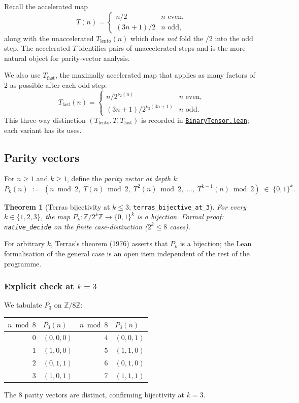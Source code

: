 \documentclass[11pt,a4paper]{article}
\theoremstyle{plain}
\newtheorem{theorem}{Theorem}[section]
\theoremstyle{definition}
\newcommand{\ZZ}{\mathbb{Z}}
\begin{document}
Recall the accelerated map
\[
  T(n) = \begin{cases} n/2 & n \text{ even}, \\
                       (3n+1)/2 & n \text{ odd}, \end{cases}
\]
along with the unaccelerated $T_{\mathrm{lento}}(n)$ which does
\emph{not} fold the $/2$ into the odd step. The accelerated $T$
identifies pairs of unaccelerated steps and is the more natural
object for parity-vector analysis.

We also use $T_{\mathrm{fast}}$, the maximally accelerated map that
applies as many factors of $2$ as possible after each odd step:
\[
   T_{\mathrm{fast}}(n) = \begin{cases}
       n/2^{\nu_2(n)} & n \text{ even}, \\
       (3n + 1)/2^{\nu_2(3n+1)} & n \text{ odd}.
   \end{cases}
\]
This three-way distinction $(T_{\mathrm{lento}}, T, T_{\mathrm{fast}})$
is recorded in
\href{run:CollatzLean4/CollatzLean4/BinaryTensor.lean}%
{\texttt{BinaryTensor.lean}}; each variant has its uses.

\subsection{Parity vectors}

For $n \ge 1$ and $k \ge 1$, define the \emph{parity vector at
depth $k$}:
\[
  P_k(n) \;:=\; (n \bmod 2,\; T(n) \bmod 2,\; T^2(n) \bmod 2,\;
                 \dots,\; T^{k-1}(n) \bmod 2)
   \;\in\; \{0, 1\}^k.
\]

\begin{theorem}[Terras bijectivity at $k \le 3$;
\texttt{terras\_bijective\_at\_3}]
\label{thm:terras-bijection}
For every $k \in \{1, 2, 3\}$, the map
\(
   P_k : \ZZ/2^k\ZZ \to \{0, 1\}^k
\)
is a bijection. Formal proof: \texttt{native\_decide} on the
finite case-distinction ($2^k \le 8$ cases).
\end{theorem}

For arbitrary $k$, Terras's theorem (1976) asserts that
$P_k$ is a bijection; the Lean formalisation of the general case is
an open item independent of the rest of the programme.

\subsubsection*{Explicit check at $k = 3$}

We tabulate $P_3$ on $\ZZ/8\ZZ$:
\begin{center}\footnotesize
\begin{tabular}{rl|rl}
\toprule
$n \bmod 8$ & $P_3(n)$ & $n \bmod 8$ & $P_3(n)$ \\
\midrule
$0$ & $(0, 0, 0)$ & $4$ & $(0, 0, 1)$ \\
$1$ & $(1, 0, 0)$ & $5$ & $(1, 1, 0)$ \\
$2$ & $(0, 1, 1)$ & $6$ & $(0, 1, 0)$ \\
$3$ & $(1, 0, 1)$ & $7$ & $(1, 1, 1)$ \\
\bottomrule
\end{tabular}
\end{center}
The 8 parity vectors are distinct, confirming bijectivity at $k = 3$.
\end{document}
